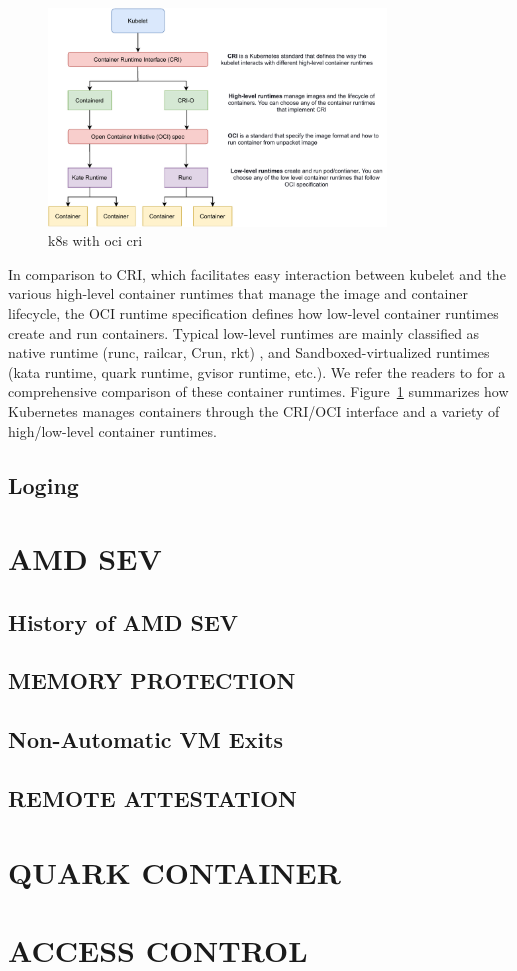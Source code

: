 \begin{figure}[H]
    \centering
    \includegraphics[width=0.8\textwidth]{images/k8s_with_oci_cri.pdf}
    \caption[k8s with oci cri]{k8s with oci cri}
    \label{fig:k8s_with_oci_cri}
\end{figure}
In comparison to CRI, which facilitates easy interaction between kubelet and the various high-level container runtimes that manage the image and container lifecycle, the OCI runtime 
specification\cite*{oci-runtime-spec} defines how low-level container runtimes create and run containers. Typical low-level runtimes are mainly classified as native runtime 
(runc\cite*{runc}, railcar\cite*{railcar}, Crun\cite*{runc}, rkt\cite*{rkt}) , and Sandboxed-virtualized runtimes (kata runtime\cite*{Kata-Containers}, quark runtime\cite*{quark}, gvisor runtime\cite*{gvisor}, etc.). 
We refer the readers to \cite*{Runtime-Comparison} for a comprehensive comparison of these container runtimes. Figure~\ref{fig:k8s_with_oci_cri} summarizes how Kubernetes manages containers through the CRI/OCI interface and a variety of high/low-level container runtimes.

\subsection{Loging}


\section{AMD SEV}
\subsection{History of AMD SEV}
\subsection{MEMORY PROTECTION}
\subsection{Non-Automatic VM Exits}
\subsection{REMOTE ATTESTATION}

\section{QUARK CONTAINER}

\section{ACCESS CONTROL}


\cleardoublepage

